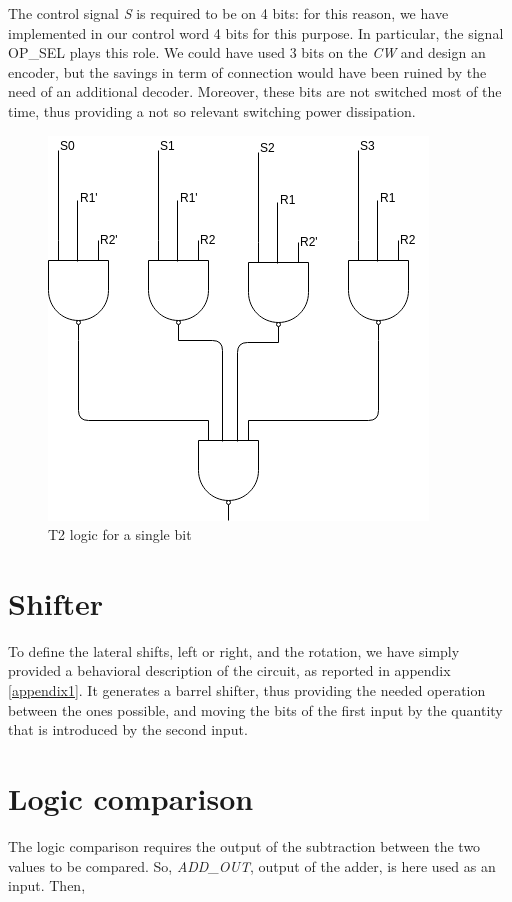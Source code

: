 The control signal \textit{S} is required to be on 4 bits: for this reason, we have implemented in our control word 4 bits for this purpose. In particular, the signal \textsf{OP\_SEL} plays this role. We could have used 3 bits on the \textit{CW} and design an encoder, but the savings in term of connection would have been ruined by the need of an additional decoder. Moreover, these bits are not switched most of the time, thus providing a not so relevant switching power dissipation.

\begin{figure}
	\centering
	\includegraphics[scale=0.6]{chapters/figures/logicT2}
	\caption{T2 logic for a single bit}
	\label{logic_fig}
\end{figure}

\section{Shifter}

To define the lateral shifts, left or right, and the rotation, we have simply provided a behavioral description of the circuit, as reported in appendix \ref{appendix1}. It generates a barrel shifter, thus providing the needed operation between the ones possible, and moving the bits of the first input by the quantity that is introduced by the second input.

\section{Logic comparison}

The logic comparison requires the output of the subtraction between the two values to be compared. So, \textit{ADD\_OUT}, output of the adder, is here used as an input. Then,